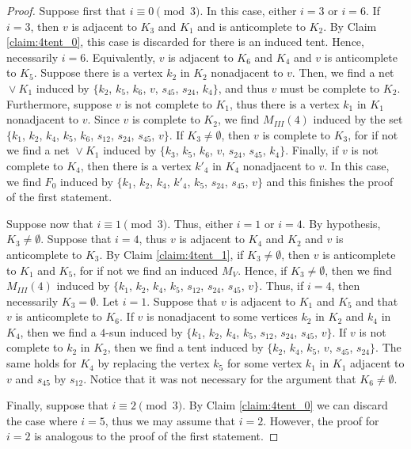 \documentclass[12pt]{book}
\theoremstyle{plain}
\theoremstyle{remark}
\begin{document}
\begin{proof}
	Suppose first that $i \equiv 0 \pmod{3}$. In this case, either $i=3$ or $i=6$. If $i=3$, then $v$ is adjacent to $K_3$ and $K_1$ and is anticomplete to $K_2$. By Claim \ref{claim:4tent_0}, this case is discarded for there is an induced tent.
	Hence, necessarily $i=6$. Equivalently, $v$ is adjacent to $K_6$ and $K_4$ and $v$ is anticomplete to $K_5$.
	Suppose there is a vertex $k_2$ in $K_2$ nonadjacent to $v$. Then, we find a net${}\vee{}K_1$ induced by $\{ k_2$, $k_5$, $k_6$, $v$, $s_{45}$, $s_{24}$, $k_4 \}$, and thus $v$ must be complete to $K_2$.
	Furthermore, suppose $v$ is not complete to $K_1$, thus there is a vertex $k_1$ in $K_1$ nonadjacent to $v$. Since $v$ is complete to $K_2$, we find $M_{III}(4)$ induced by the set $\{ k_1$, $k_2$, $k_4$, $k_5$, $k_6$, $s_{12}$, $s_{24}$, $s_{45}$, $v \}$.
	If $K_3 \neq \emptyset$, then $v$ is complete to $K_3$, for if not we find a net ${}\vee{}K_1$ induced by $\{ k_3$, $k_5$, $k_6$, $v$, $s_{24}$, $s_{45}$, $k_4 \}$.
	Finally, if $v$ is not complete to $K_4$, then there is a vertex $k'_4$ in $K_4$ nonadjacent to $v$. In this case, we find $F_0$ induced by $\{ k_1$, $k_2$, $k_4$, $k'_4$, $k_5$, $s_{24}$, $s_{45}$, $v \}$ and this finishes the proof of the first statement.
	
	Suppose now that $i \equiv 1 \pmod 3$. Thus, either $i=1$ or $i=4$.
	By hypothesis, $K_3 \neq \emptyset$. Suppose that $i=4$, thus $v$ is adjacent to $K_4$ and $K_2$ and $v$ is anticomplete to $K_3$. By Claim \ref{claim:4tent_1}, if $K_3 \neq \emptyset$, then $v$ is anticomplete to $K_1$ and $K_5$, for if not we find an induced $M_V$. Hence, if $K_3 \neq \emptyset$, then we find $M_{III}(4)$ induced by $\{ k_1$, $k_2$, $k_4$, $k_5$, $s_{12}$, $s_{24}$, $s_{45}$, $v \}$. Thus, if $i=4$, then necessarily $K_3 = \emptyset$.
	Let $i = 1$. Suppose that $v$ is adjacent to $K_1$ and $K_5$ and that $v$ is anticomplete to $K_6$. If $v$ is nonadjacent to some vertices $k_2$ in $K_2$ and $k_4$ in $K_4$, then we find a $4$-sun induced by $\{ k_1$, $k_2$, $k_4$, $k_5$, $s_{12}$, $s_{24}$, $s_{45}$, $v \}$. If $v$ is not complete to $k_2$ in $K_2$, then we find a tent induced by $\{k_2$, $k_4$, $k_5$, $v$, $s_{45}$, $s_{24}\}$. The same holds for $K_4$ by replacing the vertex $k_5$ for some vertex $k_1$ in $K_1$ adjacent to $v$ and $s_{45}$ by $s_{12}$. Notice that it was not necessary for the argument that $K_6 \neq \emptyset$.
	
	Finally, suppose that $i \equiv 2 \pmod{3}$. By Claim \ref{claim:4tent_0} we can discard the case where $i=5$, thus we may assume that $i=2$. However, the proof for $i=2$ is analogous to the proof of the first statement.

\end{proof}
\end{document}
